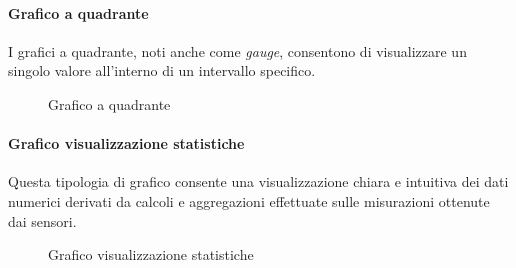 \paragraph{Grafico a quadrante}
\hypertarget{par:grafico_quadrante}{}
I grafici a quadrante, noti anche come \textit{gauge}, consentono di visualizzare un singolo valore all'interno di un intervallo specifico. 

\begin{figure}[H]
    \centering
    \caption{Grafico a quadrante}
    \label{fig:my_label}
\end{figure}


\paragraph{Grafico visualizzazione statistiche}
\hypertarget{par:visu_stat}{}
Questa tipologia di grafico consente una visualizzazione chiara e intuitiva dei dati numerici derivati da calcoli e aggregazioni effettuate sulle misurazioni ottenute dai sensori. 
\begin{figure}[H]
    \centering
    \caption{Grafico visualizzazione statistiche}
    \label{fig:my_label}
\end{figure}


